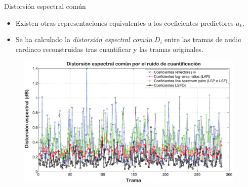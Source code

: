 \documentclass[xcolor=table]{beamer}
\begin{document}
\begin{frame}{Distorsi\'on espectral com\'un}
	\begin{itemize}
		\item<2-> Existen otras representaciones equivalentes a los coeficientes predictores $a_{k}$.		
		\item<3-> Se ha calculado la \emph{distorsi\'on espectral com\'un} $D_{i}$ entre las tramas de audio cardiaco 				  reconstruidas tras cuantificar y las tramas originales.
	\end{itemize}
	\begin{figure}\pause
		\centering
		\includegraphics[scale=0.25]{spectral_disortion.eps}
	\end{figure}
\end{frame}
\end{document}
